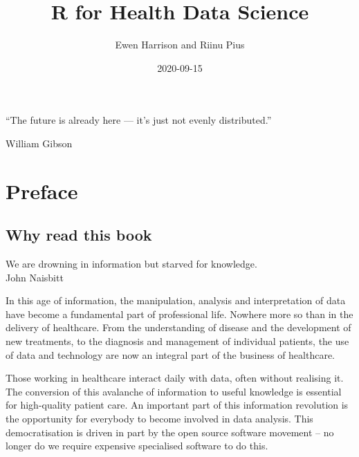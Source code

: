 \documentclass[
  12pt,
  krantz2]{krantz}
\title{R for Health Data Science}
\author{Ewen Harrison and Riinu Pius}
\date{2020-09-15}
\renewenvironment{quote}{\begin{VF}}{\end{VF}}
\begin{document}
\maketitle


\thispagestyle{empty}

\begin{center}
``The future is already here — it's just not evenly distributed.''

William Gibson
\end{center}

\setlength{\abovedisplayskip}{-5pt}
\setlength{\abovedisplayshortskip}{-5pt}

{
\hypersetup{linkcolor=}
\setcounter{tocdepth}{2}
\tableofcontents
}
\listoftables
\listoffigures
\hypertarget{preface}{%
\chapter*{Preface}\label{preface}}


\hypertarget{why-read-this-book}{%
\section*{Why read this book}\label{why-read-this-book}}


\begin{quote}
We are drowning in information but starved for knowledge.\\
John Naisbitt
\end{quote}

In this age of information, the manipulation, analysis and interpretation of data have become a fundamental part of professional life.
Nowhere more so than in the delivery of healthcare.
From the understanding of disease and the development of new treatments, to the diagnosis and management of individual patients, the use of data and technology are now an integral part of the business of healthcare.

Those working in healthcare interact daily with data, often without realising it.
The conversion of this avalanche of information to useful knowledge is essential for high-quality patient care.
An important part of this information revolution is the opportunity for everybody to become involved in data analysis.
This democratisation is driven in part by the open source software movement -- no longer do we require expensive specialised software to do this.
\end{document}
